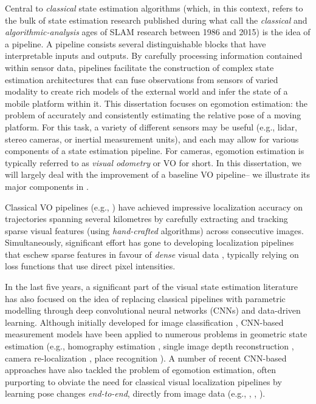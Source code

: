 Central to \textit{classical} state estimation algorithms (which, in this context, refers to the bulk of state estimation research published during what \cite{Cadena2016-ds} call the \textit{classical} and \textit{algorithmic-analysis} ages of SLAM research between 1986 and 2015) is the idea of a pipeline. A pipeline consists several distinguishable blocks that have interpretable inputs and outputs.  By carefully processing information contained within sensor data, pipelines facilitate the construction of complex state estimation architectures that can fuse observations from sensors of varied modality to create rich models of the external world and infer the state of a mobile platform within it. This dissertation focuses on egomotion estimation: the problem of accurately and consistently estimating the relative pose of a moving platform. For this task, a variety of different sensors may be useful (e.g., lidar, stereo cameras, or inertial measurement units), and each may allow for various components of a state estimation pipeline. For cameras, egomotion estimation is typically referred to as \textit{visual odometry} or VO for short. In this dissertation, we will largely deal with the improvement of a baseline VO pipeline-- we illustrate its major components in . 




Classical VO pipelines (e.g., \cite{Leutenegger2015-fk, Cvisic2015-mt, Tsotsos2015}) have achieved impressive localization accuracy on trajectories spanning several kilometres by carefully extracting and tracking sparse visual features (using \textit{hand-crafted} algorithms) across consecutive images. Simultaneously, significant effort has gone to developing localization pipelines that eschew sparse features in favour of \textit{dense} visual data \citep{Alcantarilla2016-kv, forster2014svo}, typically relying on loss functions that use direct pixel intensities. 

In the last five years, a significant part of the visual state estimation literature has also focused on the idea of replacing classical pipelines with parametric modelling through deep convolutional neural networks (CNNs) and data-driven learning. Although initially developed for image classification  \citep{LeCun2015-qf}, CNN-based measurement models have been applied to numerous problems in geometric state estimation (e.g., homography estimation \citep{DeTone2016-ue}, single image depth reconstruction \citep{Garg2016-ip},  camera re-localization \citep{Kendall2016-zf}, place recognition \citep{Sunderhauf2015-is}). A number of recent CNN-based approaches have also tackled the problem of egomotion estimation, often purporting to obviate the need for classical visual localization pipelines by learning pose changes \textit{end-to-end}, directly from image data (e.g., \cite{Melekhov2017-dl}, \cite{Handa2016-hm}, \cite{Oliveira2017-lt}).

